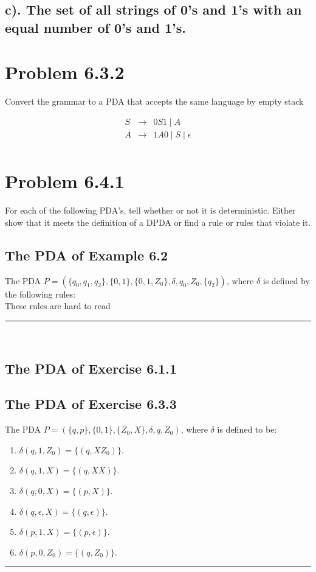 \documentclass[20pt]{article} %
\begin{document}
\subsection{c). The set of all strings of 0's and 1's with an equal number of 0's and 1's.}
\section{Problem 6.3.2}
Convert the grammar to a PDA that accepts the same language by empty stack
 \begin{table}
 \[\begin{array}{ccc} 
 S & \rightarrow & 0S1 \mid A \\
 A & \rightarrow & 1A0 \mid S \mid \epsilon \\
 \end{array}\]
 \end{table}
\section{Problem 6.4.1}
For each of the following PDA's, tell whether or not it is deterministic.  Either show that it meets the definition of a DPDA or find a rule or rules that violate it.
\subsection{The PDA of Example 6.2}
The PDA $\!P = (\{q_0, q_1, q_2\}, \{0,1\}, \{0,1,Z_0\}, \delta, q_0, Z_0, \{q_2\})$, where $\delta$ is defined by the following rules: \\ These rules are hard to read
\noindent\rule{2cm}{0.4pt} \\

\subsection{The PDA of Exercise 6.1.1}

\subsection{The PDA of Exercise 6.3.3}
The PDA $\!P = (\{q, p\}, \{0,1\}, \{Z_0,X\}, \delta, q , Z_0)$, where  $\delta$ is defined to be:
\begin{enumerate}
\item $\delta(q, 1, Z_0) = \{(q, XZ_0)\}$.
\item $\delta(q, 1, X) = \{(q, XX)\}$.
\item $\delta(q, 0, X) = \{(p, X)\}$.
\item $\delta(q, \epsilon, X) = \{(q, \epsilon)\}$.
\item $\delta(p, 1, X) = \{(p, \epsilon)\}$.
\item $\delta(p, 0, Z_0) = \{(q, Z_0)\}$.
\end{enumerate}
\noindent\rule{2cm}{0.4pt} \\
\end{document}
